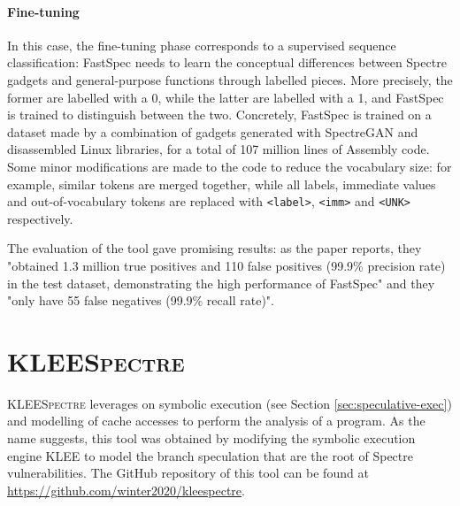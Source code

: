 \documentclass[target=mst,aauheader=aics]{thud}
\theoremstyle{definition}
\begin{document}
	\paragraph{Fine-tuning} In this case, the fine-tuning phase corresponds to a supervised sequence classification: FastSpec needs to learn the conceptual differences between Spectre gadgets and general-purpose functions through labelled pieces. More precisely, the former are labelled with a 0, while the latter are labelled with a 1, and FastSpec is trained to distinguish between the two. Concretely, FastSpec is trained on a dataset made by a combination of gadgets generated with SpectreGAN and disassembled Linux libraries, for a total of 107 million lines of Assembly code. Some minor modifications are made to the code to reduce the vocabulary size: for example, similar tokens are merged together, while all labels, immediate values and out-of-vocabulary tokens are replaced with \texttt{<label>}, \texttt{<imm>} and \texttt{<UNK>} respectively.
	
	The evaluation of the tool gave promising results: as the paper reports, they "obtained 1.3 million true positives and 110 false positives (99.9\% precision rate) in the test dataset, demonstrating the high performance of FastSpec" and they "only have 55 false negatives (99.9\% recall rate)".
	
	\section{\textsc{KLEESpectre}}\label{sec:kleespectre}
	\textsc{KLEESpectre} \cite{Wang2019} leverages on symbolic execution (see Section \ref{sec:speculative-exec}) and modelling of cache accesses to perform the analysis of a program. As the name suggests, this tool was obtained by modifying the symbolic execution engine KLEE \cite{Cadar2008} to model the branch speculation that are the root of Spectre vulnerabilities. The GitHub repository of this tool can be found at \url{https://github.com/winter2020/kleespectre}.
\end{document}
